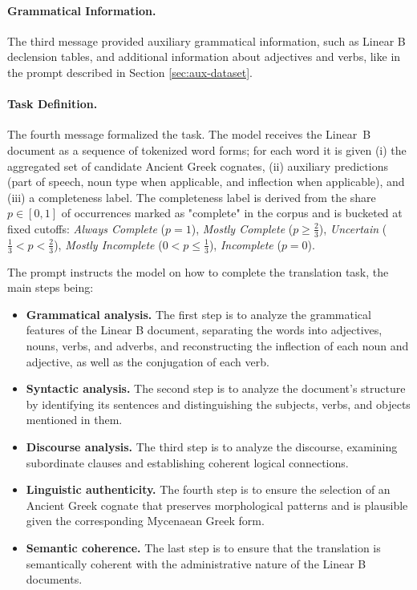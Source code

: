 \paragraph{Grammatical Information.}
The third message provided auxiliary grammatical information, such as Linear B declension tables, and additional information about adjectives and verbs, like in the prompt described in Section \ref{sec:aux-dataset}.

\paragraph{Task Definition.}
The fourth message formalized the task. The model receives the Linear~B document as a sequence of tokenized word forms; for each word it is given (i) the aggregated set of candidate Ancient Greek cognates, (ii) auxiliary predictions (part of speech, noun type when applicable, and inflection when applicable), and (iii) a completeness label.
The completeness label is derived from the share $p\!\in\![0,1]$ of occurrences marked as "complete" in the corpus and is bucketed at fixed cutoffs:
\emph{Always Complete} ($p=1$), \emph{Mostly Complete} ($p \geq \frac{2}{3}$), \emph{Uncertain} ($\frac{1}{3} < p < \frac{2}{3}$), \emph{Mostly Incomplete} ($0< p \leq \frac{1}{3}$), \emph{Incomplete} ($p=0$).

The prompt instructs the model on how to complete the translation task, the main steps being:
\begin{itemize}
  \item \textbf{Grammatical analysis.} The first step is to analyze the grammatical features of the Linear B document, separating the words into adjectives, nouns, verbs, and adverbs, and reconstructing the inflection of each noun and adjective, as well as the conjugation of each verb.
  \item \textbf{Syntactic analysis.} The second step is to analyze the document's structure by identifying its sentences and distinguishing the subjects, verbs, and objects mentioned in them.
  \item \textbf{Discourse analysis.} The third step is to analyze the discourse, examining subordinate clauses and establishing coherent logical connections.
  \item \textbf{Linguistic authenticity.} The fourth step is to ensure the selection of an Ancient Greek cognate that preserves morphological patterns and is plausible given the corresponding Mycenaean Greek form.
  \item \textbf{Semantic coherence.} The last step is to ensure that the translation is semantically coherent with the administrative nature of the Linear B documents.
\end{itemize}

